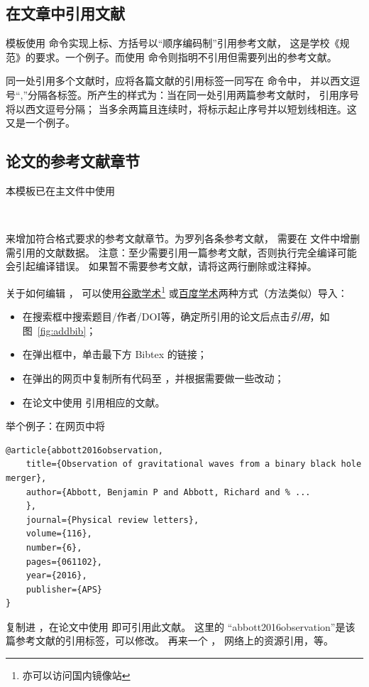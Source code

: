 \subsection{在文章中引用文献}
模板使用 命令实现上标、方括号以“顺序编码制”引用参考文献，
这是学校《规范》的要求。一个例子。\cite{abbott2016observation}而使用
命令则指明不引用但需要列出的参考文献。

同一处引用多个文献时，应将各篇文献的引用标签一同写在  命令中，
并以西文逗号“,”分隔各标签。所产生的样式为：当在同一处引用两篇参考文献时，
引用序号将以西文逗号分隔；
当多余两篇且连续时，将标示起止序号并以短划线相连。这\cite{texbook,latexrumen}
又是\cite{texbook,latexrumen,gbt7714-2005}一个例子。\cite{abbott2016observation,texbook,latexrumen,buctthesis}


\subsection{论文的参考文献章节}
本模板已在主文件中使用
\begin{lstlisting}[firstnumber=52]


	\end{lstlisting}
来增加符合格式要求的参考文献章节。为罗列各条参考文献，
需要在  文件中增删需引用的文献数据。
注意：至少需要引用一篇参考文献，否则执行完全编译可能会引起编译错误。
如果暂不需要参考文献，请将这两行删除或注释掉。

关于如何编辑 ，
可以使用\href{http://scholar.google.com.cn/}{谷歌学术}\footnote{亦可以访问国内镜像站}%
或\href{http://xueshu.baidu.com}{百度学术}两种方式（方法类似）导入\BibTeX{}：
\begin{itemize}
	\item 在搜索框中搜索题目/作者/DOI等，确定所引用的论文后点击\emph{引用}，如图~\ref{fig:addbib}；
	\item 在弹出框中，单击最下方 Bibtex 的链接；
	\item 在弹出的网页中复制所有代码至 ，并根据需要做一些改动；
	\item 在论文中使用 引用相应的文献。
\end{itemize}

举个例子：在网页中将
\begin{lstlisting}
@article{abbott2016observation,
	title={Observation of gravitational waves from a binary black hole merger},
	author={Abbott, Benjamin P and Abbott, Richard and % ...
	},
	journal={Physical review letters},
	volume={116},
	number={6},
	pages={061102},
	year={2016},
	publisher={APS}
}
	\end{lstlisting}
复制进 ，在论文中使用
即可引用此文献。
这里的 “abbott2016observation”是该篇参考文献的引用标签，可以修改。
再来一个\cite{ashirov2008tetramerization} ，
网络上的资源引用\cite{buctthesis}，等。

